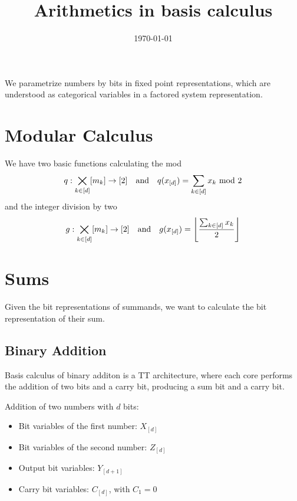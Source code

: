 \documentclass[aps,onecolumn,nofootinbib,pra]{article}
\begin{document}
    \title{Arithmetics in basis calculus}

    \maketitle
    \date{\today}

    We parametrize numbers by bits in fixed point representations, which are understood as categorical variables in a factored system representation.

    \section{Modular Calculus}

    We have two basic functions calculating the mod
    \begin{align*}
        q : \bigtimes_{k\in[d]}[m_{k}] \rightarrow [2]
        \quad\text{and}\quad q(x_{[d]}) = \sum_{k\in[d]} x_{k} \,\, \mathrm{mod} \,\, 2
    \end{align*}
    and the integer division by two
    \begin{align*}
        g : \bigtimes_{k\in[d]}[m_{k}] \rightarrow [2]
        \quad\text{and}\quad g(x_{[d]}) = \left\lfloor \frac{\sum_{k\in[d]} x_{k}}{2}\right\rfloor
    \end{align*}


    \section{Sums}

    Given the bit representations of summands, we want to calculate the bit representation of their sum.

    \subsection{Binary Addition}

    Basis calculus of binary additon is a TT architecture, where each core performs the addition of two bits and a carry bit, producing a sum bit and a carry bit.

    Addition of two numbers with $d$ bits:
    \begin{itemize}
        \item Bit variables of the first number: $X_{[d]}$
        \item Bit variables of the second number: $Z_{[d]}$
        \item Output bit variables: $Y_{[d+1]}$
        \item Carry bit variables: $C_{[d]}$, with $C_{1} = 0$
    \end{itemize}
\end{document}
